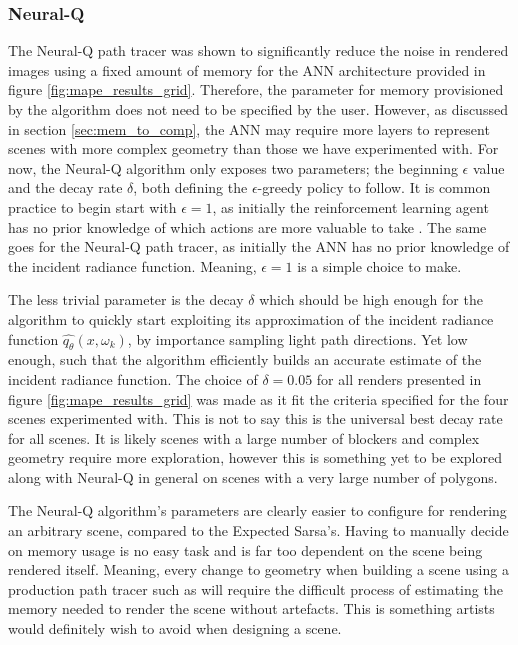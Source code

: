 \documentclass[../dissertation.tex]{subfiles}
\begin{document}
\subsubsection{Neural-Q}
 The Neural-Q path tracer was shown to significantly reduce the noise in rendered images using a fixed amount of memory for the ANN architecture provided in figure \ref{fig:mape_results_grid}. Therefore, the parameter for memory provisioned by the algorithm does not need to be specified by the user. However, as discussed in section \ref{sec:mem_to_comp}, the ANN may require more layers to represent scenes with more complex geometry than those we have experimented with. For now, the Neural-Q algorithm only exposes two parameters; the beginning $\epsilon$ value and the decay rate $\delta$, both defining the $\epsilon$-greedy policy to follow. It is common practice to begin start with $\epsilon = 1$, as initially the reinforcement learning agent has no prior knowledge of which actions are more valuable to take \cite{mnih2013playing, van2016deep, mnih2015human}. The same goes for the Neural-Q path tracer, as initially the ANN has no prior knowledge of the incident radiance function. Meaning, $\epsilon = 1$ is a simple choice to make. 
 
 The less trivial parameter is the decay $\delta$ which should be high enough for the algorithm to quickly start exploiting its approximation of the incident radiance function $\hat{q_\theta}(x, \omega_k)$, by importance sampling light path directions. Yet low enough, such that the algorithm efficiently builds an accurate estimate of the incident radiance function. The choice of $\delta = 0.05$ for all renders presented in figure \ref{fig:mape_results_grid} was made as it fit the criteria specified for the four scenes experimented with. This is not to say this is the universal best decay rate for all scenes. It is likely scenes with a large number of blockers and complex geometry require more exploration, however this is something yet to be explored along with Neural-Q in general on scenes with a very large number of polygons.
 
The Neural-Q algorithm's parameters are clearly easier to configure for rendering an arbitrary scene, compared to the Expected Sarsa's. Having to manually decide on memory usage is no easy task and is far too dependent on the scene being rendered itself. Meaning, every change to geometry when building a scene using a production path tracer such as \cite{georgiev2018arnold, christensen2018renderman, hyperion} will require the difficult process of estimating the memory needed to render the scene without artefacts. This is something artists would definitely wish to avoid when designing a scene.
\end{document}
